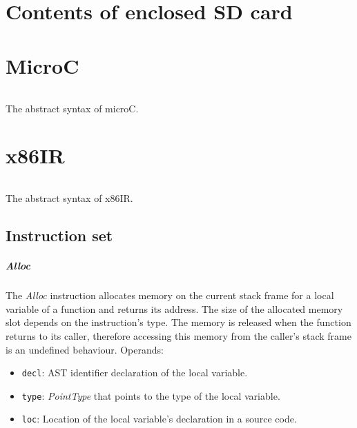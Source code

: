 \documentclass[thesis=M,english]{FITthesis}[2019/12/23]
\begin{document}
\chapter{Contents of enclosed SD card}
\begin{figure}
\end{figure}



\chapter{MicroC}\label{chap:microC}

\begin{listing}[H]
	\inputminted[tabsize=2,breaklines,bgcolor=codebg]{bnf}{snippets/microC.m}
	\caption{The abstract syntax of microC.}
	\label{lst:microC}
\end{listing}

\chapter{x86IR}\label{chap:x86IR}

\begin{listing}[H]
	\inputminted[tabsize=2,breaklines,bgcolor=codebg]{bnf}{snippets/x86IR.m}
	\caption{The abstract syntax of x86IR.}
	\label{lst:x86IR}
\end{listing}

\section{Instruction set}\label{sec:x86IR_instr_set}
\paragraph*{Alloc} The \emph{Alloc} instruction allocates memory on the current stack frame for a local variable of a function and returns its address. The size of the allocated memory slot depends on the instruction's type. The memory is released when the function returns to its caller, therefore accessing this memory from the caller's stack frame is an undefined behaviour. Operands:
\begin{itemize}
    \item \texttt{decl}: AST identifier declaration of the local variable.
    \item \texttt{type}: \emph{PointType} that points to the type of the local variable.
    \item \texttt{loc}: Location of the local variable's declaration in a source code.
\end{itemize}
\end{document}
